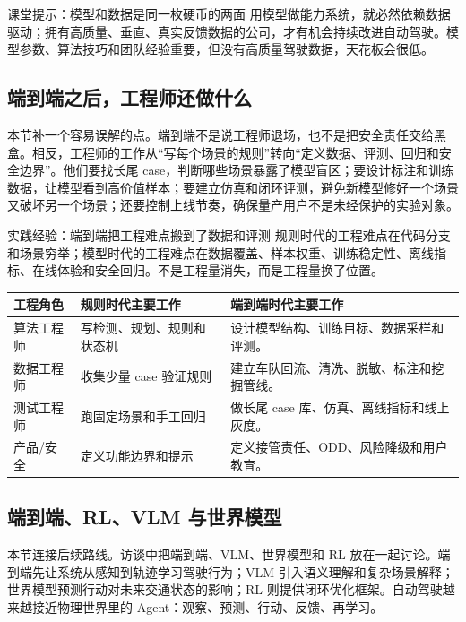 \begin{importantbox}{课堂提示：模型和数据是同一枚硬币的两面}
用模型做能力系统，就必然依赖数据驱动；拥有高质量、垂直、真实反馈数据的公司，才有机会持续改进自动驾驶。模型参数、算法技巧和团队经验重要，但没有高质量驾驶数据，天花板会很低。
\end{importantbox}

\subsection{端到端之后，工程师还做什么}

本节补一个容易误解的点。端到端不是说工程师退场，也不是把安全责任交给黑盒。相反，工程师的工作从“写每个场景的规则”转向“定义数据、评测、回归和安全边界”。他们要找长尾 case，判断哪些场景暴露了模型盲区；要设计标注和训练数据，让模型看到高价值样本；要建立仿真和闭环评测，避免新模型修好一个场景又破坏另一个场景；还要控制上线节奏，确保量产用户不是未经保护的实验对象。

\begin{knowledgebox}{实践经验：端到端把工程难点搬到了数据和评测}
规则时代的工程难点在代码分支和场景穷举；模型时代的工程难点在数据覆盖、样本权重、训练稳定性、离线指标、在线体验和安全回归。不是工程量消失，而是工程量换了位置。
\end{knowledgebox}

\noindent\begin{tabularx}{\textwidth}{p{}p{}X}
\toprule
工程角色 & 规则时代主要工作 & 端到端时代主要工作 \\
\midrule
算法工程师 & 写检测、规划、规则和状态机 & 设计模型结构、训练目标、数据采样和评测。 \\
数据工程师 & 收集少量 case 验证规则 & 建立车队回流、清洗、脱敏、标注和挖掘管线。 \\
测试工程师 & 跑固定场景和手工回归 & 做长尾 case 库、仿真、离线指标和线上灰度。 \\
产品/安全 & 定义功能边界和提示 & 定义接管责任、ODD、风险降级和用户教育。 \\
\bottomrule
\end{tabularx}

\subsection{端到端、RL、VLM 与世界模型}

本节连接后续路线。访谈中把端到端、VLM、世界模型和 RL 放在一起讨论。端到端先让系统从感知到轨迹学习驾驶行为；VLM 引入语义理解和复杂场景解释；世界模型预测行动对未来交通状态的影响；RL 则提供闭环优化框架。自动驾驶越来越接近物理世界里的 Agent：观察、预测、行动、反馈、再学习。

